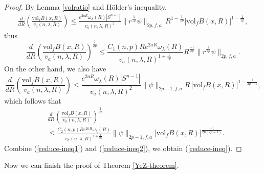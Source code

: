 \documentclass[11pt]{amsart}
\numberwithin{equation}{section}
\newcommand{\vol}{\mathrm{vol}}
\begin{document}
\begin{proof}
	By Lemma \ref{volratio} and  H\"{o}lder's inequality,
	\begin{align*}
		\frac{d}{dR}\left(\frac{\vol_fB(x,R)}{v_a(n,\lambda,R)}\right)\leq \frac{e^{2aR}\omega_\lambda(R)|S^{n-1}|}{v_a(n,\lambda,R)^2}\|r^{\frac{1}{2p}}\psi\|_{2p,f,a}\,R^{1-\frac{1}{2p}}\big[\vol_fB(x,R)\big]^{1-\frac{1}{2p}},
	\end{align*}
	thus
	\begin{equation}
	\frac{d}{dR}\left(\frac{\vol_fB(x,R)}{v_a(n,\lambda,R)}\right)^{\frac{1}{2p}}\leq \frac{C_1(n,p)Re^{2aR}\omega_\lambda(R)}{v_a(n,\lambda,R)^{1+\frac{1}{2p}}}R^{\frac{-1}{2p}}\|r^{\frac{1}{2p}}\psi\|_{2p,f,a}.\label{reduce-ineq1}
	\end{equation}
	On the other hand, we also have
	\[
	\frac{d}{dR}\left(\frac{\vol_fB(x,R)}{v_a(n,\lambda,R)}\right)\leq \frac{e^{2aR}\omega_\lambda(R)|S^{n-1}|}{v_a(n,\lambda,R)^2}\|\psi\|_{2p-1,f,a}R\,\big[\vol_fB(x,R)\big]^{1-\frac{1}{2p-1}},
	\]
	which follows that
	\begin{equation}
		\begin{aligned}
			&\frac{d}{dR}\left(\frac{\vol_fB(x,R)}{v_a(n,\lambda,R)}\right)^{\frac{1}{2p}}\\
			&\leq \frac{C_2(n,p)Re^{2aR}\omega_\lambda(R)}{v_a(n,\lambda,R)^{1+\frac{1}{2p}}}\|\psi\|_{2p-1,f,a}\big[\vol_fB(x,R)\big]^{\frac{-1}{2p(2p-1)}}.\label{reduce-ineq2}
		\end{aligned}
	\end{equation}
	Combine (\ref{reduce-ineq1}) and (\ref{reduce-ineq2}), we obtain (\ref{reduce-ineq}).
\end{proof}

Now we can finish the proof of  Theorem  \ref{YeZ-theorem}.
\end{document}
